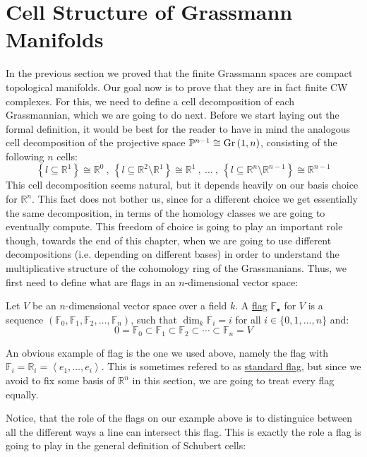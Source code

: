 \section{Cell Structure of Grassmann Manifolds}
In the previous section we proved that the finite Grassmann spaces are compact topological manifolds. Our goal now is to prove that they are in fact finite CW complexes. For this, we need to define a cell decomposition of each Grassmannian, which we are going to do next. Before we start laying out the formal definition, it would be best for the reader to have in mind the analogous cell decomposition of the projective space $\mathbb{P}^{n-1}\cong\Gr{1}{n}$, consisting of the following $n$ cells:
$$\left\{l\subseteq\mathbb{R}^1\right\}\cong\mathbb{R}^0\ ,\ \left\{l\subseteq\mathbb{R}^2\setminus\mathbb{R}^1\right\}\cong\mathbb{R}^1\ ,\ \ldots\ ,\ \left\{l\subseteq\mathbb{R}^n\setminus\mathbb{R}^{n-1}\right\}\cong\mathbb{R}^{n-1}$$
This cell decomposition seems natural, but it depends heavily on our basis choice for $\mathbb{R}^n$. This fact does not bother us, since for a different choice we get essentially the same decomposition, in terms of the homology classes we are going to eventually compute. This freedom of choice is going to play an important role though, towards the end of this chapter, when we are going to use different decompositions (i.e. depending on different bases) in order to understand the multiplicative structure of the cohomology ring of the Grassmanians. Thus, we first need to define what are flags in an $n$-dimensional vector space:

\begin{definition} Let $V$ be an $n$-dimensional vector space over a field $k$. A \ul{flag} $\mathbb{F}_{\bullet}$ for $V$ is a sequence $\left(\mathbb{F}_0,\mathbb{F}_1,\mathbb{F}_2,\ldots,\mathbb{F}_n\right)$, such that $\dim_k\mathbb{F}_i = i$ for all $i\in\{0,1,\ldots,n\}$ and:
$$0=\mathbb{F}_0\subset\mathbb{F}_1\subset\mathbb{F}_2\subset\cdots\subset\mathbb{F}_n=V$$
\end{definition}

An obvious example of flag is the one we used above, namely the flag with $\mathbb{F}_i=\mathbb{R}_i=\left<e_1,\ldots,e_i\right>$. This is sometimes refered to as \ul{standard flag}, but since we avoid to fix some basis of $\mathbb{R}^n$ in this section, we are going to treat every flag equally.

Notice, that the role of the flags on our example above is to distinguice between all the different ways a line can intersect this flag. This is exactly the role a flag is going to play in the general definition of Schubert cells:

